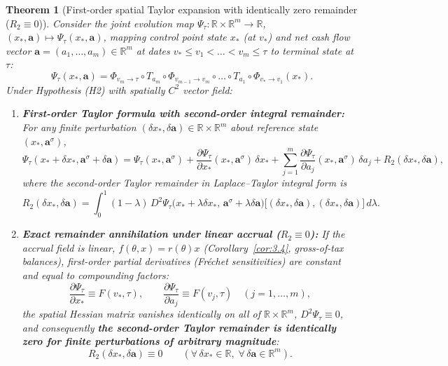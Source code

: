 \documentclass[11pt, a4paper]{article}
\theoremstyle{definition}
\theoremstyle{plain}
\newtheorem{teorema}[definicao]{Theorem}
\theoremstyle{remark}
\begin{document}
\begin{teorema}[First-order spatial Taylor expansion with identically zero remainder (\texorpdfstring{$R_2 \equiv 0$}{R2 = 0})]\label{teo:4.5}
Consider the joint evolution map $\Psi_\tau : \mathbb{R} \times \mathbb{R}^m \to \mathbb{R}$, $(x_*, \mathbf{a}) \mapsto \Psi_\tau(x_*, \mathbf{a})$, mapping control point state $x_*$ (at $v_*$) and net cash flow vector $\mathbf{a} = (a_1, \dots, a_m) \in \mathbb{R}^m$ at dates $v_* \le v_1 < \dots < v_m \le \tau$ to terminal state at $\tau$:
\[
\Psi_\tau(x_*, \mathbf{a}) = \Phi_{v_m \to \tau} \circ T_{a_m} \circ \Phi_{v_{m-1} \to v_m} \circ \dots \circ T_{a_1} \circ \Phi_{v_* \to v_1}(x_*).
\]
Under Hypothesis (H2) with spatially $C^2$ vector field:
\begin{enumerate}[label=(\roman*)]
    \item \textbf{First-order Taylor formula with second-order integral remainder:} For any finite perturbation $(\delta x_*, \delta\mathbf{a}) \in \mathbb{R} \times \mathbb{R}^m$ about reference state $(x_*, \mathbf{a}^\sigma)$,
    \[
    \Psi_\tau(x_* + \delta x_*, \mathbf{a}^\sigma + \delta\mathbf{a}) = \Psi_\tau(x_*, \mathbf{a}^\sigma) + \frac{\partial \Psi_\tau}{\partial x_*}(x_*, \mathbf{a}^\sigma)\,\delta x_* + \sum_{j=1}^{m} \frac{\partial \Psi_\tau}{\partial a_j}(x_*, \mathbf{a}^\sigma)\,\delta a_j + R_2(\delta x_*, \delta\mathbf{a}),
    \]
    where the second-order Taylor remainder in Laplace--Taylor integral form is
    \[
    R_2(\delta x_*, \delta\mathbf{a}) = \int_0^1 (1 - \lambda)\, D^2 \Psi_\tau\big(x_* + \lambda\delta x_*,\, \mathbf{a}^\sigma + \lambda\delta\mathbf{a}\big)\big[(\delta x_*, \delta\mathbf{a}), (\delta x_*, \delta\mathbf{a})\big]\,d\lambda.
    \]
    \item \textbf{Exact remainder annihilation under linear accrual (\texorpdfstring{$R_2 \equiv 0$}{R2 = 0}):} If the accrual field is linear, $f(\theta, x) = r(\theta)x$ (Corollary~\ref{cor:3.4}, gross-of-tax balances), first-order partial derivatives (Fréchet sensitivities) are constant and equal to compounding factors:
    \[
    \frac{\partial \Psi_\tau}{\partial x_*} \equiv F(v_*, \tau), \qquad \frac{\partial \Psi_\tau}{\partial a_j} \equiv F(v_j, \tau) \quad (j = 1, \dots, m),
    \]
    the spatial Hessian matrix vanishes identically on all of $\mathbb{R} \times \mathbb{R}^m$, $D^2 \Psi_\tau \equiv 0$, and consequently \textbf{the second-order Taylor remainder is identically zero for finite perturbations of arbitrary magnitude}:
    \[
    R_2(\delta x_*, \delta\mathbf{a}) \equiv 0 \qquad (\forall\, \delta x_* \in \mathbb{R},\; \forall\, \delta\mathbf{a} \in \mathbb{R}^m).
    \]
\end{enumerate}
\end{teorema}
\end{document}
